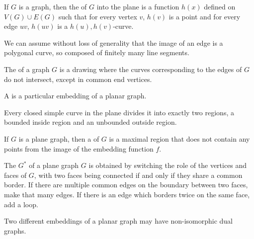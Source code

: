 
\begin{definition}
  If $G$ is a graph, then the  of $G$ into the plane is a
  function $h(x)$ defined on $V(G) \cup E(G)$ such that for every vertex $v$,
  $h(v)$ is a point and for every edge $uv$, $h(uv)$ is a $h(u),h(v)$-curve.
\end{definition}

\begin{remark}
  We can assume without loss of generality that the image of an edge is a
  polygonal curve, so composed of finitely many line segments.
\end{remark}

\begin{definition}
  The  of a graph $G$ is a drawing where the curves
  corresponding to the edges of $G$ do not intersect, except in common end
  vertices.
\end{definition}

\begin{definition}
  A  is a particular embedding of a planar graph.
\end{definition}

\begin{theorem}[Jordan]
  Every closed simple curve in the plane divides it into exactly two regions, a
  bounded inside region and an unbounded outside region.
\end{theorem}

\begin{definition}
  If $G$ is a plane graph, then a  of $G$ is a maximal region that
  does not contain any points from the image of the embedding function $f$.
\end{definition}

\begin{definition}
  The  $G^*$ of a plane graph $G$ is obtained by switching the
  role of the vertices and faces of $G$, with two faces being connected if and
  only if they share a common border.
  If there are multiple common edges on the boundary between two faces, make
  that many edges.
  If there is an edge which borders twice on the same face, add a loop.
\end{definition}

\begin{remark}
  Two different embeddings of a planar graph may have non-isomorphic dual
  graphs.
\end{remark}

